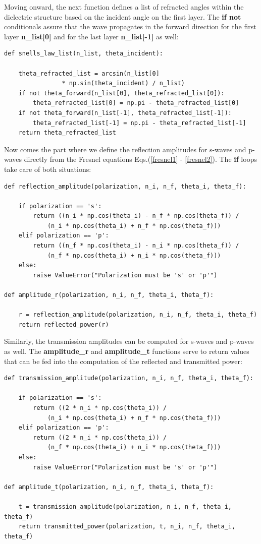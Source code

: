 \documentclass[preprint, onecolumn, amsmath, amssymb, aps]{revtex4-1}
\numberwithin{equation}{section}
\begin{document}
\noindent
Moving onward, the next function defines a list of refracted angles within the dielectric structure based on the incident angle on the first layer. The \textbf{if not} conditionals assure that the wave propagates in the forward direction for the first layer \textbf{n\_list[0]} and for the last layer \textbf{n\_list[-1]} as well:
\lstset{showspaces=false,showstringspaces=false}%
\begin{lstlisting}
def snells_law_list(n_list, theta_incident):

	theta_refracted_list = arcsin(n_list[0] 
				* np.sin(theta_incident) / n_list)
	if not theta_forward(n_list[0], theta_refracted_list[0]):
		theta_refracted_list[0] = np.pi - theta_refracted_list[0]
	if not theta_forward(n_list[-1], theta_refracted_list[-1]):
		theta_refracted_list[-1] = np.pi - theta_refracted_list[-1]
	return theta_refracted_list
\end{lstlisting}
\noindent
Now comes the part where we define the reflection amplitudes for s-waves and p-waves directly from the Fresnel equations Eqs.(\ref{fresnel1} - \ref{fresnel2}). The \textbf{if} loops take care of both situations: 
\lstset{showspaces=false,showstringspaces=false}%
\begin{lstlisting}
def reflection_amplitude(polarization, n_i, n_f, theta_i, theta_f):

	if polarization == 's':
		return ((n_i * np.cos(theta_i) - n_f * np.cos(theta_f)) /
			(n_i * np.cos(theta_i) + n_f * np.cos(theta_f)))
	elif polarization == 'p':
		return ((n_f * np.cos(theta_i) - n_i * np.cos(theta_f)) /
			(n_f * np.cos(theta_i) + n_i * np.cos(theta_f)))
	else:
		raise ValueError("Polarization must be 's' or 'p'")

def amplitude_r(polarization, n_i, n_f, theta_i, theta_f):

	r = reflection_amplitude(polarization, n_i, n_f, theta_i, theta_f)
	return reflected_power(r)
\end{lstlisting}
\noindent
Similarly, the transmission amplitudes can be computed for s-waves and p-waves as well. The \textbf{amplitude\_r} and \textbf{amplitude\_t} functions serve to return values that can be fed into the computation of the reflected and transmitted power:
\lstset{showspaces=false,showstringspaces=false}%
\begin{lstlisting}
def transmission_amplitude(polarization, n_i, n_f, theta_i, theta_f):

	if polarization == 's':
		return ((2 * n_i * np.cos(theta_i)) / 
			(n_i * np.cos(theta_i) + n_f * np.cos(theta_f)))
	elif polarization == 'p':
		return ((2 * n_i * np.cos(theta_i)) / 
			(n_f * np.cos(theta_i) + n_i * np.cos(theta_f)))
	else:
		raise ValueError("Polarization must be 's' or 'p'")

def amplitude_t(polarization, n_i, n_f, theta_i, theta_f):

	t = transmission_amplitude(polarization, n_i, n_f, theta_i, theta_f)
	return transmitted_power(polarization, t, n_i, n_f, theta_i, theta_f)
\end{lstlisting}
\end{document}
